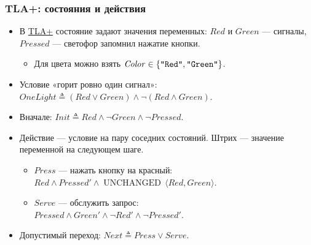 \documentclass[11pt]{beamer}
\begin{document}
\begin{frame}
  \frametitle{TLA+: состояния и действия}
  \begin{itemize}
    \item В \href{https://lamport.azurewebsites.net/tla/tla.html}{TLA+} состояние задают значения переменных: $\mathit{Red}$ и $\mathit{Green}$ — сигналы, $\mathit{Pressed}$ — светофор запомнил нажатие кнопки.
      \pause
      \begin{itemize}
        \item Для цвета можно взять $\mathit{Color} \in \{\text{\texttt{\detokenize{"Red"}}}, \text{\texttt{\detokenize{"Green"}}}\}$.
      \end{itemize}
    \pause
    \item Условие «горит ровно один сигнал»:
          $\mathit{OneLight} \triangleq (\mathit{Red} \lor \mathit{Green}) \land \neg(\mathit{Red} \land \mathit{Green})$.
    \item Вначале: $\mathit{Init} \mathrel{\triangleq} \mathit{Red} \land \neg\mathit{Green} \land \neg\mathit{Pressed}$.
          \pause
    \item Действие — условие на пару соседних состояний. Штрих — значение переменной на следующем шаге.
      \begin{itemize}
        \item $\mathit{Press}$ — нажать кнопку на красный:\\
              $\mathit{Red} \land \mathit{Pressed}' \land
              \mathop{\mathrm{UNCHANGED}}\,\langle\mathit{Red},\mathit{Green}\rangle$.
        \item $\mathit{Serve}$ — обслужить запрос:\\
              $\mathit{Pressed} \land \mathit{Green}' \land \neg\mathit{Red}' \land \neg\mathit{Pressed}'$.
      \end{itemize}
    \item Допустимый переход: $\mathit{Next} \triangleq \mathit{Press} \lor \mathit{Serve}$.
  \end{itemize}
\end{frame}
\end{document}
